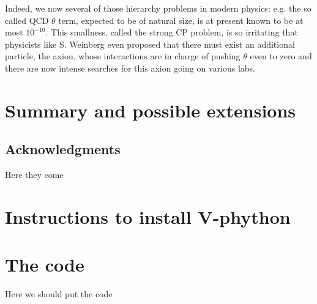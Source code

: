 \documentclass[12pt]{iopart}
\begin{document}
Indeed, we now several of those hierarchy problems in modern physics: e.g. the so called QCD $\theta$ term,
expected to be of natural size, is at present known to be at most $10^{-10}$. This smallness, called the
strong CP problem, is so irritating that physicists like S. Weinberg even proposed that there must exist an
additional particle, the axion, whose interactions are in charge of pushing $\theta$ even to zero and there
are now intense searches for this axion going on various labs.

\section{Summary and possible extensions}

%



\subsection{Acknowledgments}
Here they come

\appendix
\section{Instructions to install V-phython}
\label{appendix:python}

\section{The code}
Here we should put the code




\end{document}
